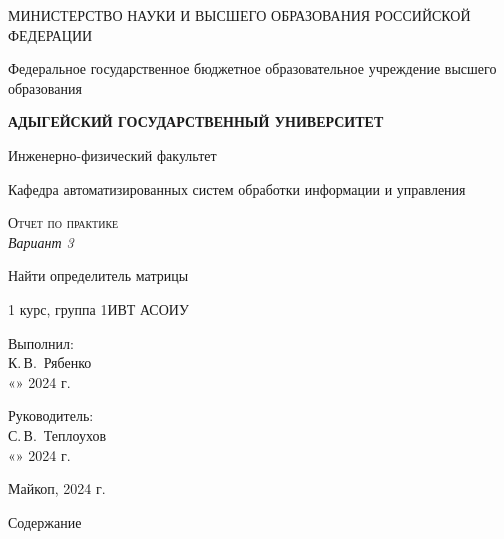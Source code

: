 \documentclass[12pt,a4paper]{scrartcl}
\begin{document}
	\begin{titlepage}
		\begin{center}
			\large
			МИНИСТЕРСТВО НАУКИ И ВЫСШЕГО ОБРАЗОВАНИЯ РОССИЙСКОЙ ФЕДЕРАЦИИ
			
			Федеральное государственное бюджетное образовательное учреждение высшего образования
			
			\textbf{АДЫГЕЙСКИЙ ГОСУДАРСТВЕННЫЙ УНИВЕРСИТЕТ}
			\vspace{0.25cm}
			
			Инженерно-физический факультет
			
			Кафедра автоматизированных систем обработки информации и управления
			\vfill

			\vfill
			
			\textsc{Отчет по практике}\\[5mm]
			
			\LARGE\textit{Вариант 3}
			
			{\LARGE Найти определитель матрицы}
			\bigskip
			
			1 курс, группа 1ИВТ АСОИУ
		\end{center}
		\vfill
		
		\newlength{\ML}
		\hfill\begin{minipage}{0.5\textwidth}
			Выполнил:\\
			\underline{\hspace{\ML}} К.\,В.~Рябенко\\
			«\underline{\hspace{0.7cm}}» \underline{\hspace{2cm}} 2024 г.
		\end{minipage}%
		\bigskip
		
		\hfill\begin{minipage}{0.5\textwidth}
			Руководитель:\\
			\underline{\hspace{\ML}} С.\,В.~Теплоухов\\
			«\underline{\hspace{0.7cm}}» \underline{\hspace{2cm}} 2024 г.
		\end{minipage}%
		
		
		\vfill
		
		
		
		\begin{center}
			
			Майкоп, 2024 г.
		\end{center}
	\end{titlepage}
\LARGE{Содержание}
\end{document}
